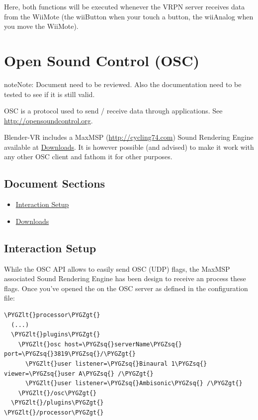 \documentclass[a4,10pt,openany,oneside]{sphinxmanual}
\def\PYGZlt{\char`\<}
\def\PYGZgt{\char`\>}
\def\PYGZsq{\char`\'}
\begin{document}
Here, both functions will be executed whenever the VRPN server receives data from the
WiiMote (the wiiButton when your touch a button, the wiiAnalog when you move the
WiiMote).


\section{Open Sound Control (OSC)}
\label{components/osc:open-sound-control-osc}\label{components/osc::doc}
\begin{notice}{note}{Note:}
Document need to be reviewed. Also the documentation need to be tested to see if it is still valid.
\end{notice}

OSC is a protocol used to send / receive data through applications. See
\href{http://opensoundcontrol.org}{http://opensoundcontrol.org}.

Blender-VR includes a MaxMSP (\href{http://cycling74.com}{http://cycling74.com}) Sound Rendering Engine
available at {\hyperref[components/osc:downloads]{Downloads}}. It is however possible (and advised) to
make it work with any other OSC client and fathom it for other purposes.


\subsection{Document Sections}
\label{components/osc:document-sections}\begin{itemize}
\item {} 
{\hyperref[components/osc:interaction-setup]{Interaction Setup}}

\item {} 
{\hyperref[components/osc:downloads]{Downloads}}

\end{itemize}


\subsection{Interaction Setup}
\label{components/osc:interaction-setup}
While the OSC API allows to easily send OSC (UDP) flags, the MaxMSP associated
Sound Rendering Engine has been design to receive an process these flags.
Once you’ve opened the  on the
OSC server as defined in the  configuration file:

\begin{Verbatim}[commandchars=\\\{\}]
\PYGZlt{}processor\PYGZgt{}
  (...)
  \PYGZlt{}plugins\PYGZgt{}
    \PYGZlt{}osc host=\PYGZsq{}serverName\PYGZsq{} port=\PYGZsq{}3819\PYGZsq{}/\PYGZgt{}
      \PYGZlt{}user listener=\PYGZsq{}Binaural 1\PYGZsq{} viewer=\PYGZsq{}user A\PYGZsq{} /\PYGZgt{}
      \PYGZlt{}user listener=\PYGZsq{}Ambisonic\PYGZsq{} /\PYGZgt{}
    \PYGZlt{}/osc\PYGZgt{}
  \PYGZlt{}/plugins\PYGZgt{}
\PYGZlt{}/processor\PYGZgt{}
\end{Verbatim}
\end{document}
